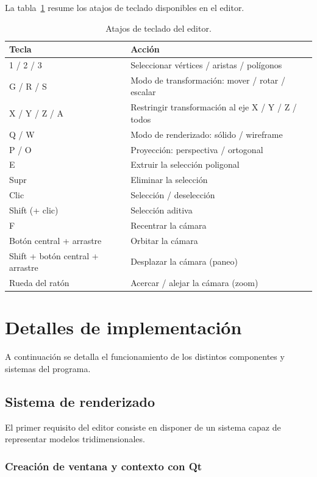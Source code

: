 La tabla~\ref{tab:atajos} resume los atajos de teclado disponibles en el editor.

\begin{table}[htbp]
\centering
\begin{tabular}{ll}
\hline
\textbf{Tecla} & \textbf{Acción} \\
\hline
1 / 2 / 3 & Seleccionar vértices / aristas / polígonos \\
G / R / S & Modo de transformación: mover / rotar / escalar \\
X / Y / Z / A & Restringir transformación al eje X / Y / Z / todos \\
Q / W & Modo de renderizado: sólido / wireframe \\
P / O & Proyección: perspectiva / ortogonal \\
E & Extruir la selección poligonal \\
Supr & Eliminar la selección \\
Clic & Selección / deselección \\
Shift (+ clic) & Selección aditiva \\
F & Recentrar la cámara \\
Botón central + arrastre & Orbitar la cámara \\
Shift + botón central + arrastre & Desplazar la cámara (paneo) \\
Rueda del ratón & Acercar / alejar la cámara (zoom) \\
\hline
\end{tabular}
\caption{Atajos de teclado del editor.}
\label{tab:atajos}
\end{table}

\section{Detalles de implementación} \label{sec:detalles-implementacion}

A continuación se detalla el funcionamiento de los distintos componentes y sistemas del programa.

\subsection{Sistema de renderizado}

El primer requisito del editor consiste en disponer de un sistema capaz de representar modelos tridimensionales.

\subsubsection{Creación de ventana y contexto con Qt}

